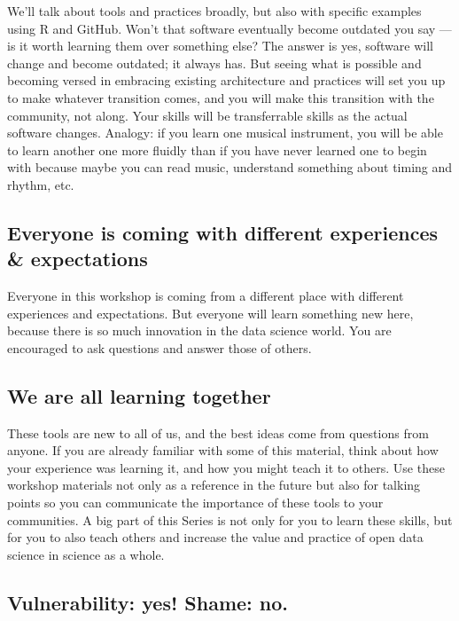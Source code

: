 \documentclass[
  letterpaper,
  DIV=11,
  numbers=noendperiod]{scrreprt}
\begin{document}
We'll talk about tools and practices broadly, but also with specific
examples using R and GitHub. Won't that software eventually become
outdated you say --- is it worth learning them over something else? The
answer is yes, software will change and become outdated; it always has.
But seeing what is possible and becoming versed in embracing existing
architecture and practices will set you up to make whatever transition
comes, and you will make this transition with the community, not along.
Your skills will be transferrable skills as the actual software changes.
Analogy: if you learn one musical instrument, you will be able to learn
another one more fluidly than if you have never learned one to begin
with because maybe you can read music, understand something about timing
and rhythm, etc.

\hypertarget{everyone-is-coming-with-different-experiences-expectations}{%
\subsection{Everyone is coming with different experiences \&
expectations}\label{everyone-is-coming-with-different-experiences-expectations}}

Everyone in this workshop is coming from a different place with
different experiences and expectations. But everyone will learn
something new here, because there is so much innovation in the data
science world. You are encouraged to ask questions and answer those of
others.

\hypertarget{we-are-all-learning-together}{%
\subsection{We are all learning
together}\label{we-are-all-learning-together}}

These tools are new to all of us, and the best ideas come from questions
from anyone. If you are already familiar with some of this material,
think about how your experience was learning it, and how you might teach
it to others. Use these workshop materials not only as a reference in
the future but also for talking points so you can communicate the
importance of these tools to your communities. A big part of this Series
is not only for you to learn these skills, but for you to also teach
others and increase the value and practice of open data science in
science as a whole.

\hypertarget{vulnerability-yes-shame-no.}{%
\subsection{Vulnerability: yes! Shame:
no.}\label{vulnerability-yes-shame-no.}}
\end{document}
